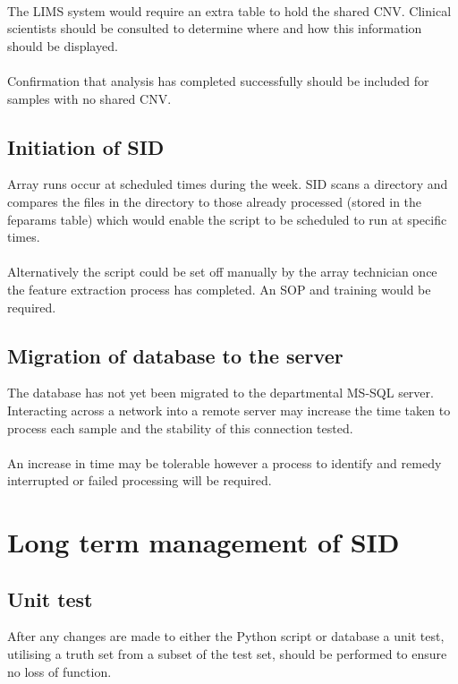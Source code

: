 \paragraph*{}
The LIMS system would require an extra table to hold the shared CNV. Clinical scientists should be consulted to determine where and how this information should be displayed.
\paragraph*{}
Confirmation that analysis has completed successfully should be included for samples with no shared CNV.

\subsection{Initiation of SID}
Array runs occur at scheduled times during the week. SID scans a directory and compares the files in the directory to those already processed (stored in the feparams table) which would enable the script to be scheduled to run at specific times.
\paragraph*{}
Alternatively the script could be set off manually by the array technician once the feature extraction process has completed. An SOP and training would be required.

\subsection{Migration of database to the server}
The database has not yet been migrated to the departmental MS-SQL server.  Interacting across a network into a remote server may increase the time taken to process each sample and the stability of this connection tested.
\paragraph*{}
An increase in time may be tolerable however a process to identify and remedy interrupted or failed processing will be required. 

\section{Long term management of SID}
\subsection{Unit test}
After any changes are made to either the Python script or database a unit test, utilising a truth set from a subset of the test set, should be performed to ensure no loss of function.

